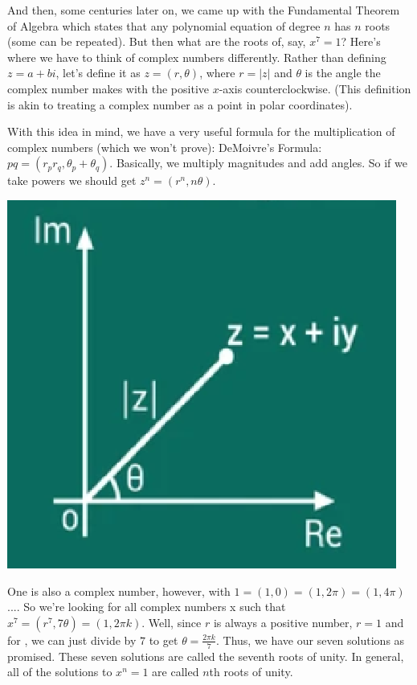 \documentclass{article}
\begin{document}
And then, some centuries later on, we came up with the Fundamental Theorem of Algebra which states that any polynomial equation of degree $n$ has $n$ roots (some can be repeated). But then what are the roots of, say, $x^7=1$? Here’s where we have to think of complex numbers differently. Rather than defining $z=a+bi$, let’s define it as $z=(r,\theta)$, where $r=|z|$ and $\theta$  is the angle the complex number makes with the positive $x$-axis counterclockwise. (This definition is akin to treating a complex number as a point in polar coordinates). 

With this idea in mind, we have a very useful formula for the multiplication of complex numbers (which we won’t prove): DeMoivre’s Formula: $pq=(r_pr_q,\theta_p+\theta_q)$. Basically, we multiply magnitudes and add angles. So if we take powers we should get $z^n=(r^n,n\theta)$. 
\begin{center}
\includegraphics[scale=0.8]{images/complex1.png}
\end{center}
One is also a complex number, however, with $1=(1,0)=(1,2\pi)=(1,4\pi)$.... So we’re looking for all complex numbers x such that $x^7=(r^7,7\theta)=(1,2\pi k)$. Well, since $r$ is always a positive number, $r=1$ and for , we can just divide by $7$ to get $\theta=\frac{2\pi k}{7}$. Thus, we have our seven solutions as promised. These seven solutions are called the seventh roots of unity. In general, all of the solutions to $x^n=1$ are called $n$th roots of unity. 
\end{document}
